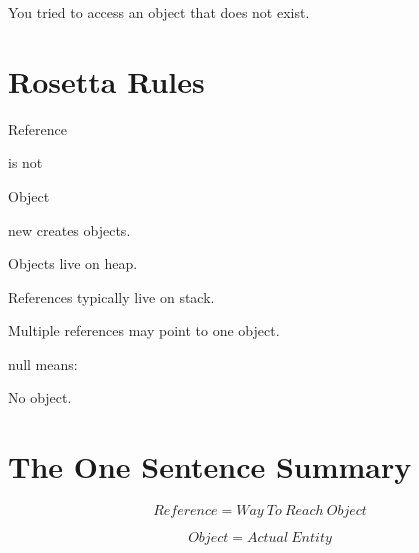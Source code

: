 \documentclass[11pt,a4paper]{book}
\begin{document}
You tried to access an object that does not exist.


\section{Rosetta Rules}

\begin{rosettarule}

Reference

is not

Object

\end{rosettarule}

\begin{rosettarule}

new creates objects.

\end{rosettarule}

\begin{rosettarule}

Objects live on heap.

\end{rosettarule}

\begin{rosettarule}

References typically live on stack.

\end{rosettarule}

\begin{rosettarule}

Multiple references may point to one object.

\end{rosettarule}

\begin{rosettarule}

null means:

No object.

\end{rosettarule}


\section{The One Sentence Summary}

\[
Reference
=
Way\ To\ Reach\ Object
\]

\[
Object
=
Actual\ Entity
\]
\end{document}
